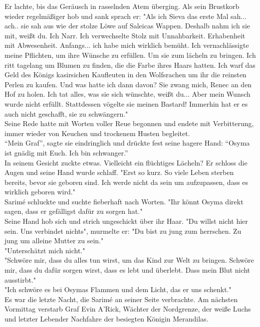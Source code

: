 Er lachte, bis das Geräusch in rasselnden Atem überging. Als sein Brustkorb wieder regelmäßiger hob 
und sank sprach er: "Als ich Sieva das erste Mal sah... ach.. sie sah aus wie der stolze Löwe auf 
Saleicas Wappen. Deshalb nahm ich sie mit, weißt du. Ich Narr. Ich verwechselte Stolz mit 
Unnahbarkeit. Erhabenheit mit Abwesenheit. Anfangs... ich habe mich wirklich bemüht. Ich 
vernachlässigte meine Pflichten, um ihre Wünsche zu erfüllen. Um sie zum lächeln zu bringen. Ich 
ritt tagelang um Blumen zu finden, die die Farbe ihres Haars hatten. Ich warf das Geld des Königs 
kasirsichen Kaufleuten in den Wolfsrachen um ihr die reinsten Perlen zu kaufen. 
Und was hatte ich dann davon? Sie zwang mich, Renec an den Hof zu holen. Ich tat alles, was sie sich 
wünschte, weißt du... Aber mein Wunsch wurde nicht erfüllt. Stattdessen vögelte sie meinen Bastard! 
Immerhin hat er es auch nicht geschafft, sie zu schwängern."\\
Seine Rede hatte mit Worten voller Reue begonnen und endete mit Verbitterung, immer wieder von 
Keuchen und trockenem Husten begleitet.\\
``Mein Graf'', sagte sie eindringlich und drückte fest seine hagere Hand: ``Osyma ist gnädig mit 
Euch. Ich bin schwanger.''\\
In seinem Gesicht zuckte etwas. Vielleicht ein flüchtiges Lächeln? Er schloss die Augen und seine 
Hand wurde schlaff. "Erst so kurz. So viele Leben sterben bereits, bevor sie geboren sind. Ich 
werde nicht da sein um aufzupassen, dass es wirklich geboren wird."\\
Sarimé schluckte und suchte fieberhaft nach Worten. "Ihr könnt Osyma direkt sagen, dass er 
gefälligst dafür zu sorgen hat."\\
Seine Hand hob sich und strich ungeschickt über ihr Haar. "Du willst nicht hier sein. Uns verbindet 
nichts", murmelte er: "Du bist zu jung zum herrschen. Zu jung um alleine Mutter zu sein."\\
"Unterschätzt mich nicht."\\
"Schwöre mir, dass du alles tun wirst, um das Kind zur Welt zu bringen. Schwöre mir, dass du dafür 
sorgen wirst, dass es lebt und überlebt. Dass mein Blut nicht ausstirbt."\\
"Ich schwöre es bei Osymas Flammen und dem Licht, das er uns schenkt."\\
Es war die letzte Nacht, die Sarimé an seiner Seite verbrachte. Am nächsten Vormittag verstarb Graf 
Evin A’Rick, Wächter der Nordgrenze, der weiße Luchs und letzter Lebender Nachfahre der besiegten 
Königin Merandilas.\\


